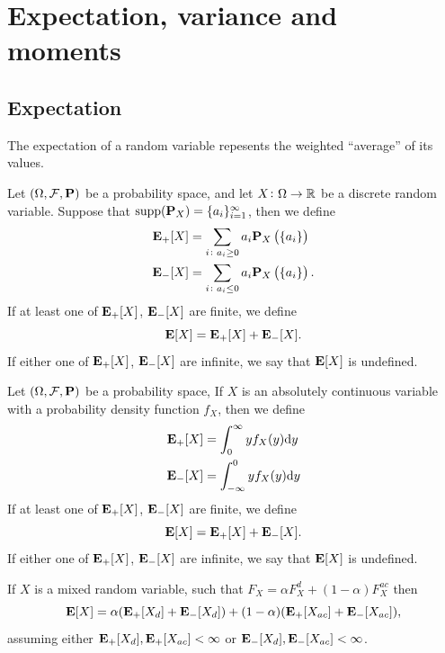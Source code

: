 \documentclass[11pt,a4paper]{article}
\begin{document}
\newpage

\section{Expectation, variance and moments}

\subsection{Expectation}
\begin{remark}
  The expectation of a random variable repesents the weighted ``average'' of 
  its values.
\end{remark}

\begin{definition}
  Let $(\Omega, \mathcal F, \mathbf{P})$ be a probability space,
  and let $X \colon \Omega \to \mathbb{R}$ be a discrete random variable.
  Suppose that $\operatorname{supp}(\mathbf{P}_X) = \{a_i\}_{i=1}^{\infty}$, then we define
  \begin{align*}
    \mathbf{E}_{+}[X] &=
    \sum_{i \colon a_i \geq 0} a_i \mathbf{P}_X\left(\{a_i\}\right) \\
    \mathbf{E}_{-}[X] &=
    \sum_{i \colon a_i \le 0} a_i \mathbf{P}_X\left(\{a_i\}\right).
  \end{align*}
  If at least one of $\mathbf{E}_{+}[X]$, $\mathbf{E}_{-}[X]$ are finite, 
  we define
  \[
    \mathbf{E}[X] = \mathbf{E}_{+}[X] + \mathbf{E}_{-}[X].
  \]
  If either one of $\mathbf{E}_{+}[X]$, $\mathbf{E}_{-}[X]$ are infinite,
  we say that $\mathbf{E}[X]$ is undefined.
\end{definition}
\begin{definition}
  Let $(\Omega, \mathcal F, \mathbf{P})$ be a probability space,
  If $X$ is an absolutely continuous variable with a probability density
  function $f_X$, then we define
  \begin{align*}
    \E_{+}[X] &=
    \int_{0}^{\infty} y f_X(y)\dy \\
    \E_{-}[X] &=
    \int_{-\infty}^{0} y f_X(y)\dy
  \end{align*}
  If at least one of $\mathbf{E}_{+}[X]$, $\mathbf{E}_{-}[X]$ are finite, 
  we define
  \[
    \mathbf{E}[X] = \mathbf{E}_{+}[X] + \mathbf{E}_{-}[X].
  \]
  If either one of $\mathbf{E}_{+}[X]$, $\mathbf{E}_{-}[X]$ are infinite,
  we say that $\mathbf{E}[X]$ is undefined. 
\end{definition}

\begin{remark}
  If $X$ is a mixed random variable, such that 
  $F_X = \alpha F_X^d + (1-\alpha)F_X^{ac}$ then
  \[
    \mathbf{E}[X] = 
    \alpha (\mathbf{E}_{+}[X_d] + \mathbf{E}_{-}[X_d]) +
    (1 - \alpha) (\mathbf{E}_{+}[X_{ac}] + \mathbf{E}_{-}[X_{ac}]),
  \]
  assuming either $\mathbf{E}_+[X_{d}], \mathbf{E}_+[X_{ac}] < \infty$ or
  $\mathbf{E}_-[X_{d}], \mathbf{E}_-[X_{ac}] < \infty$.
\end{remark}
\end{document}
